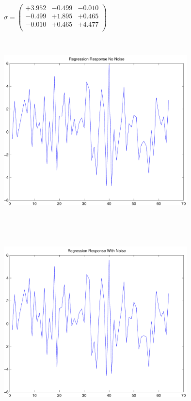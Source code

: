 \documentclass[9pt]{article}
\theoremstyle{plain}
\theoremstyle{definition}
\theoremstyle{remark}
\numberwithin{equation}{section}
\begin{document}
$\sigma = \left(
\begin{array}{
ccc}
+3.952 & -0.499 & -0.010 \\
-0.499 & +1.895 & +0.465 \\
-0.010 & +0.465 & +4.477 \\
\end{array}
\right)$ \newline 

\includegraphics[width=10.0cm,height=10.0cm]{regression_response_no_noise.pdf}

\includegraphics[width=10.0cm,height=10.0cm]{regression_response_with_noise.pdf}
\end{document}
